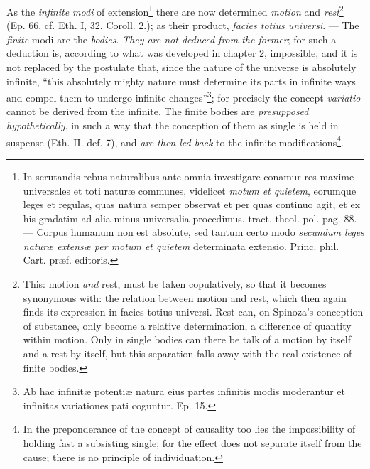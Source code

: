 \documentclass[12pt,a4paper,openany]{book}
\newcommand{\opage}[1]{\marginnote{\footnotesize\textit{[#1]}}}
\begin{document}
As the \emph{infinite modi} of extension\footnote{In scrutandis rebus
naturalibus ante omnia investigare conamur res maxime universales
et toti naturæ communes, videlicet \emph{motum et quietem}, eorumque
leges et regulas, quas natura semper observat et per quas
continuo agit, et ex his gradatim ad alia minus universalia
procedimus. tract. theol.-pol. pag. 88. --- Corpus humanum non
est absolute, sed tantum certo modo \emph{secundum leges naturæ
extensæ per motum et quietem} determinata extensio. Princ. phil.
Cart. præf. editoris.} there are now determined \emph{motion} and
\emph{rest}\footnote{This: motion \emph{and} rest, must be taken copulatively,
so that it becomes synonymous with: the relation between motion
and rest, which then again finds its expression in facies totius
universi. Rest can, on Spinoza's conception of substance,
only become a relative determination, a difference of quantity within
motion. Only in single bodies can there be talk of a
motion by itself and a rest by itself, but this separation
falls away with the real existence of finite bodies.} (Ep. 66,
cf. Eth. I, 32. Coroll. 2.); as their product, \emph{facies totius
universi}. --- The \emph{finite} modi are the \emph{bodies}. \emph{They are not deduced
from the former}; for such a deduction is, according to what was
developed in chapter 2, impossible, and it is not replaced by the postulate that,
since the nature of the universe is absolutely infinite, ``this
absolutely mighty nature must determine its parts in infinite ways and
compel them to undergo infinite
changes''\footnote{Ab hac infinitæ potentiæ natura eius
partes infinitis modis moderantur et infinitas variationes pati
coguntur. Ep. 15.}; for precisely the concept \emph{variatio} cannot be
derived from the infinite. The finite bodies are \emph{presupposed
hypothetically}, in such a way that the conception of them
\opage{79}\setcounter{footnote}{0}as single is held in suspense (Eth. II. def. 7), and \emph{are then led
back} to the infinite modifications\footnote{In the preponderance of the
concept of causality too lies the impossibility of holding fast
a subsisting single; for the effect does not separate itself from the
cause; there is no principle of individuation.}.
\end{document}
